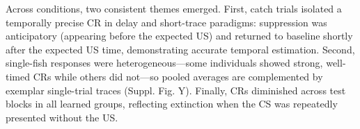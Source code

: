 Across conditions, two consistent themes emerged. First, catch trials isolated a temporally precise CR in delay and short-trace paradigms: suppression was anticipatory (appearing before the expected US) and returned to baseline shortly after the expected US time, demonstrating accurate temporal estimation. Second, single-fish responses were heterogeneous---some individuals showed strong, well-timed CRs while others did not---so pooled averages are complemented by exemplar single-trial traces (Suppl. Fig. Y). Finally, CRs diminished across test blocks in all learned groups, reflecting extinction when the CS was repeatedly presented without the US.











